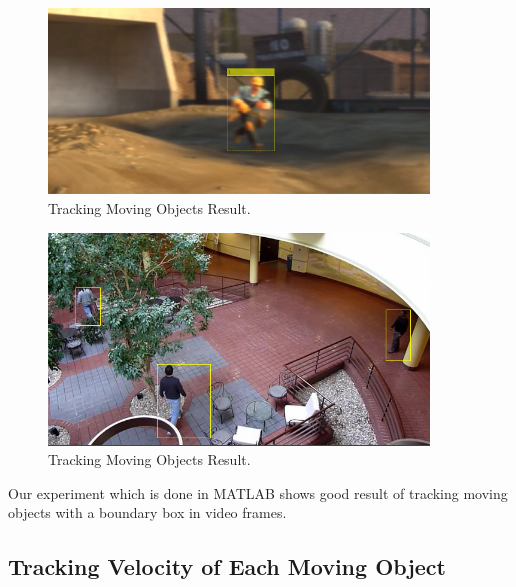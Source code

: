 \begin{figure}[H]
  \centering
  \includegraphics[width=0.9\textwidth]{figures/man1}
  \caption{Tracking Moving Objects Result.}
  \label{fig:man1}
\end{figure} 

\begin{figure}[H]
  \centering
  \includegraphics[width=0.9\textwidth]{figures/man3}
  \caption{Tracking Moving Objects Result.}
  \label{fig:man3}
\end{figure} 
    
Our experiment which is done in MATLAB shows good result of tracking moving objects with a boundary box in video frames.

\subsection{Tracking Velocity of Each Moving Object}\label{velocity}


